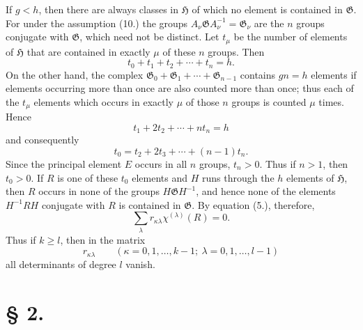\documentclass[11pt]{article}
\newcommand{\Hgr}{\mathfrak{H}}
\newcommand{\Ggr}{\mathfrak{G}}
\begin{document}
If $g<h$, then there are always classes in $\Hgr$ of which no element is contained in $\Ggr$. For under the assumption (10.) the groups $A_\nu\Ggr A_\nu^{-1}=\Ggr_\nu$ are the $n$ groups conjugate with $\Ggr$, which need not be distinct. Let $t_\mu$ be the number of elements of $\Hgr$ that are contained in exactly $\mu$ of these $n$ groups. Then
\[
  t_0+t_1+t_2+\cdots+t_n=h.
\]
On the other hand, the complex $\Ggr_0+\Ggr_1+\cdots+\Ggr_{n-1}$ contains $gn=h$ elements if elements occurring more than once are also counted more than once; thus each of the $t_\mu$ elements which occurs in exactly $\mu$ of those $n$ groups is counted $\mu$ times. Hence
\[
  t_1+2t_2+\cdots+nt_n=h
\]
and consequently
\[
  t_0=t_2+2t_3+\cdots+(n-1)t_n.
\]
Since the principal element $E$ occurs in all $n$ groups, $t_n>0$. Thus if $n>1$, then $t_0>0$. If $R$ is one of these $t_0$ elements and $H$ runs through the $h$ elements of $\Hgr$, then $R$ occurs in none of the groups $H\Ggr H^{-1}$, and hence none of the elements $H^{-1}RH$ conjugate with $R$ is contained in $\Ggr$. By equation (5.), therefore,
\[
  \sum_\lambda r_{\kappa\lambda}\chi^{(\lambda)}(R)=0.
\]
Thus if $k\ge l$, then in the matrix
\[
\tag{18.}
  r_{\kappa\lambda}\qquad(\kappa=0,1,\ldots,k-1;\ \lambda=0,1,\ldots,l-1)
\]
all determinants of degree $l$ vanish.

\section*{§ 2.}
\end{document}
